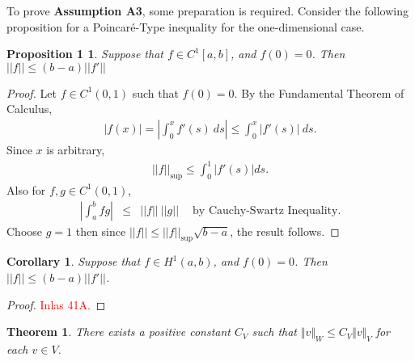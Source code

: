 \documentclass[../../main.tex]{subfiles}
\begin{document}
To prove \textbf{Assumption A3}, some preparation is required. Consider the following proposition for a Poincar\'e-Type inequality for the one-dimensional case.
\newtheorem*{Poincare}{Proposition 1}
\begin{Poincare}
	Suppose that $f \in C^1[a,b]$, and $f(0) = 0$. Then $||f|| \leq (b-a)||f'||$
\end{Poincare}
\begin{proof}
	Let $f \in C^1(0,1)$ such that $f(0) = 0$. By the Fundamental Theorem of Calculus,
	\begin{eqnarray*}
		|f(x)| = \left|\int_0^x f'(s) \ ds\right| \leq \int_0^x |f'(s)| \ ds.
	\end{eqnarray*}
	Since $x$ is arbitrary,
	\begin{eqnarray*}
		||f||_{\sup} \leq \int_0^1 |f'(s)| ds.
	\end{eqnarray*}
	Also for $f,g \in C^1(0,1)$,
	\begin{eqnarray}
		\left| \int_a^b fg \right| & \leq & ||f||\ ||g|| \ \ \ \ \textrm{ by Cauchy-Swartz Inequality.} \label{CSI}
	\end{eqnarray}
	Choose $g = 1$ then since $||f|| \leq ||f||_{\sup} \sqrt{b-a}$, the result follows.
\end{proof}

\newtheorem*{Poincare_2}{Corollary}
\begin{Poincare_2}
	Suppose that $f \in H^1(a,b)$, and $f(0) = 0$. Then $||f|| \leq (b-a)||f'||$.
\end{Poincare_2}
\begin{proof}
	\textcolor{red}{Inlas 41A.}
\end{proof}


\newtheorem{Theorem_1}{Theorem}
\begin{Theorem_1}
There exists a positive constant $C_{V}$ such that $\Vert v\Vert_{W} \leq C_{V}\Vert v\Vert_{V}$ for each $v \in V$.
\end{Theorem_1}
\end{document}
